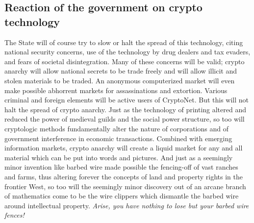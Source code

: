 \documentclass[12pt, a4paper]{article}
\begin{document}
\begin{flushleft}
\begin{justify}
\section{Reaction of the government on crypto technology}
The State will of course try to slow or halt the spread of this technology,
citing national security concerns, use of the technology by drug dealers and
tax evaders, and fears of societal disintegration. Many of these concerns will
be valid; crypto anarchy will allow national secrets to be trade freely and
will allow illicit and stolen materials to be traded. An anonymous computerized
market will even make possible abhorrent markets for assassinations and
extortion. Various criminal and foreign elements will be active users of
CryptoNet. But this will not halt the spread of crypto anarchy.
Just as the technology of printing altered and reduced the power of medieval
guilds and the social power structure, so too will cryptologic methods
fundamentally alter the nature of corporations and of government interference
in economic transactions. Combined with emerging information markets, crypto
anarchy will create a liquid market for any and all material which can be put
into words and pictures. And just as a seemingly minor invention like barbed
wire made possible the fencing-off of vast ranches and farms, thus altering
forever the concepts of land and property rights in the frontier West, so too
will the seemingly minor discovery out of an arcane branch of mathematics come
to be the wire clippers which dismantle the barbed wire around intellectual
property. \textsl{Arise, you have nothing to lose but your barbed wire fences!}
\end{justify}
\end{flushleft}
\end{document}
